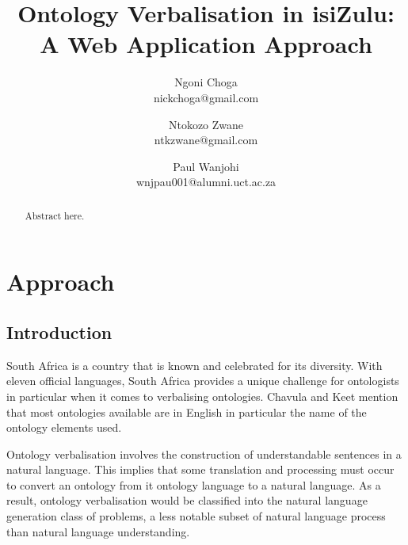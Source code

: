 \documentclass[11pt,a4paper]{article}
\begin{document}
\title{Ontology Verbalisation in isiZulu:\\ A Web Application Approach} \date{}
\author{Ngoni Choga\\ nickchoga@gmail.com
\and Ntokozo Zwane\\ ntkzwane@gmail.com
\and Paul Wanjohi\\ wnjpau001@alumni.uct.ac.za}

\chead{}
\rhead{\date{}}   %
\lfoot{}
\cfoot{\thepage}    %
\rfoot{}
\renewcommand{\headrulewidth}{0.0pt}   %

\maketitle
\thispagestyle{plain}  %

\begin{abstract}
	Abstract here.
\end{abstract}

\section{Approach}


\subsection{Introduction}
\label{ss:introduction}

South Africa is a country that is known and celebrated for its diversity. 
With eleven official languages, South Africa provides a unique challenge 
for ontologists in particular when it comes to verbalising ontologies.
Chavula and Keet mention that most ontologies available are in 
English in particular the name of the ontology elements used. \cite{RefWorks:32}

Ontology verbalisation involves the construction of understandable sentences 
in a natural language. This implies that some translation and processing must
occur to convert an ontology from it ontology language to a natural language. 
As a result, ontology verbalisation would be classified into the natural 
language generation class of problems, a less notable subset of natural
language process than natural language understanding. \cite{RefWorks:29} 
\end{document}
